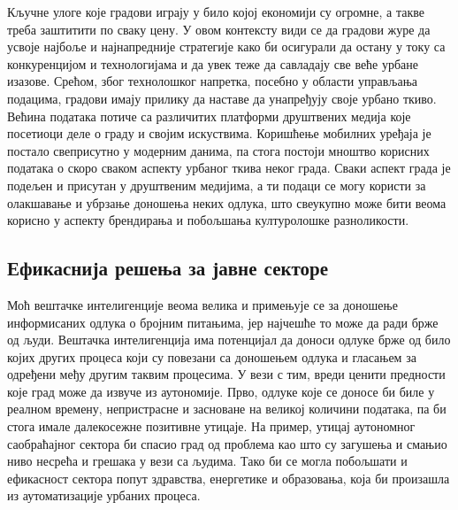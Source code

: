 \documentclass{article}
\begin{document}
Кључне улоге које градови играју у било којој економији су огромне, а такве треба заштитити по сваку цену. У овом контексту види се да градови журе да усвоје најбоље и најнапредније стратегије како би осигурали да остану у току са конкуренцијом и технологијама и да увек теже да савладају све веће урбане изазове. Срећом, због технолошког напретка, посебно у области управљања подацима, градови имају прилику да наставе да унапређују своје урбано ткиво. Већина података потиче са различитих платформи друштвених медија које посетиоци деле о граду и својим искуствима. Коришћење мобилних уређаја је постало свеприсутно у модерним данима, па стога постоји мноштво корисних података о скоро сваком аспекту урбаног ткива неког града. Сваки аспект града је подељен и присутан у друштвеним медијима, а ти подаци се могу користи за олакшавање и убрзање доношења неких одлука, што свеукупно може бити веома корисно у аспекту брендирања и побољшања културолошке разноликости.

\subsection{Ефикаснија решења за јавне секторе}
Моћ вештачке интелигенције веома велика и примењује се за доношење информисаних одлука о бројним питањима, јер најчешће то може да ради брже од људи. Вештачка интелигенција има потенцијал да доноси одлуке брже од било којих других процеса који су повезани са доношењем одлука и гласањем за одређени међу другим таквим процесима. У вези с тим, вреди ценити предности које град може да извуче из аутономије. Прво, одлуке које се доносе би биле у реалном времену, непристрасне и засноване на великој количини података, па би стога имале далекосежне позитивне утицаје. На пример, утицај аутономног саобраћајног сектора би спасио град од проблема као што су загушења и смањио ниво несрећа и грешака у вези са људима. Тако би се могла побољшати и ефикасност сектора попут здравства, енергетике и образовања, која би произашла из аутоматизације урбаних процеса.
\end{document}
